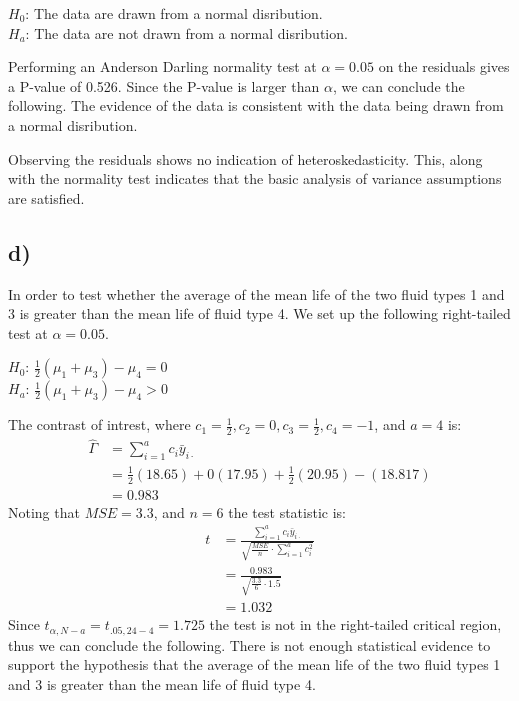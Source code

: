\documentclass{article}
\begin{document}
\begin{flushleft}
$H_0$: The data are drawn from a normal disribution. \\
$H_a$: The data are not drawn from a normal disribution. \\
\end{flushleft}
Performing an Anderson Darling normality test at $\alpha = 0.05$ on the residuals gives a P-value of 0.526.
Since the P-value is larger than $\alpha$, we can conclude the following. 
The evidence of the data is consistent with the data being drawn from a normal disribution.

Observing the residuals shows no indication of heteroskedasticity. This, along with the normality test indicates that the
basic analysis of variance assumptions are satisfied.
\subsection*{d)}
In order to test whether the average of the mean life of the two fluid types 1 and 3 is greater than the
mean life of fluid type 4. We set up the following right-tailed test at $\alpha = 0.05$.
\begin{flushleft}
  $H_0$: $\frac{1}{2}(\mu_1 + \mu_3) - \mu_4 = 0$ \\
  $H_a$: $\frac{1}{2}(\mu_1 + \mu_3) - \mu_4 > 0$ \\
\end{flushleft}
The contrast of intrest, where $c_1 = \frac{1}{2}, c_2 = 0, c_3 = \frac{1}{2}, c_4 = -1$, and $a = 4$ is:
\begin{align*}
    \hat{\Gamma} &=  \sum_{i=1}^{a} c_i \bar{y}_{i \cdot} \\
                &= \frac{1}{2}(18.65) + 0(17.95) + \frac{1}{2}(20.95) - (18.817) \\
                &= 0.983 
\end{align*}
Noting that $MSE = 3.3$, and $n = 6$ the test statistic is:
\begin{align*}
  t &=  \frac{\sum_{i=1}^{a} c_i \bar{y}_{i \cdot}}{\sqrt{\frac{MSE}{n} \cdot \sum_{i=1}^{a} c_i^2}} \\
              &= \frac{0.983}{\sqrt{\frac{3.3}{6} \cdot 1.5}} \\
              &= 1.032
\end{align*}
Since $t_{\alpha,N-a} = t_{.05,24-4} = 1.725$ the test is not in the right-tailed critical region, thus we can conclude the following.
There is not enough statistical evidence to support the hypothesis that the average of the mean life of the two fluid types 1 and 3 is greater than the
mean life of fluid type 4.
\end{document}
